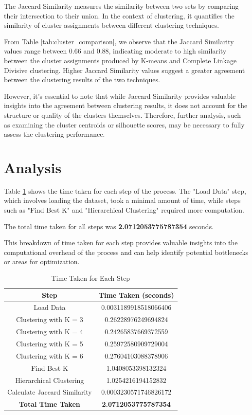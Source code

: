 \documentclass[12pt]{article}
\begin{document}
	The Jaccard Similarity measures the similarity between two sets by comparing their intersection to their union. In the context of clustering, it quantifies the similarity of cluster assignments between different clustering techniques. 
	
	From Table \ref{tab:cluster_comparison}, we observe that the Jaccard Similarity values range between 0.66 and 0.88, indicating moderate to high similarity between the cluster assignments produced by K-means and Complete Linkage Divisive clustering. Higher Jaccard Similarity values suggest a greater agreement between the clustering results of the two techniques.
	
	However, it's essential to note that while Jaccard Similarity provides valuable insights into the agreement between clustering results, it does not account for the structure or quality of the clusters themselves. Therefore, further analysis, such as examining the cluster centroids or silhouette scores, may be necessary to fully assess the clustering performance.


\section{Analysis}

Table \ref{tab:time_taken} shows the time taken for each step of the process. The "Load Data" step, which involves loading the dataset, took a minimal amount of time, while steps such as "Find Best K" and "Hierarchical Clustering" required more computation. 

The total time taken for all steps was \textbf{2.0712053775787354} seconds.

This breakdown of time taken for each step provides valuable insights into the computational overhead of the process and can help identify potential bottlenecks or areas for optimization.

\begin{table}[htbp]
    \centering
    \begin{tabular}{cc}
        \toprule
        \textbf{Step} & \textbf{Time Taken (seconds)} \\
        \midrule
        Load Data & 0.0031189918518066406 \\
        Clustering with K = 3 & 0.26228976249694824 \\
        Clustering with K = 4 & 0.24265837669372559 \\
        Clustering with K = 5 & 0.25972580909729004 \\
        Clustering with K = 6 & 0.27604103088378906 \\
        Find Best K & 1.0408053398132324 \\
        Hierarchical Clustering & 1.0254216194152832 \\
        Calculate Jaccard Similarity & 0.0003230571746826172 \\
        \midrule
        \textbf{Total Time Taken} & \textbf{2.0712053775787354} \\
        \bottomrule
    \end{tabular}
    \caption{Time Taken for Each Step}
    \label{tab:time_taken}
\end{table}
\end{document}
